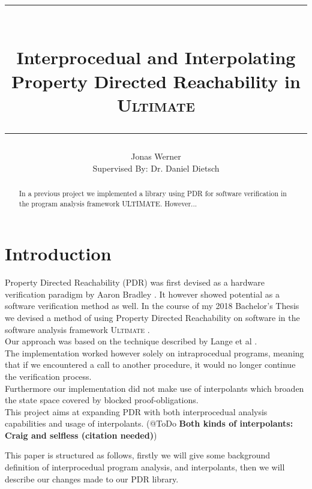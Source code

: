 \documentclass{article}
\begin{document}
	\newcommand{\HorizontalLine}{\rule{\linewidth}{0.3mm}}
	
	\title{ \HorizontalLine \\ \textbf{Interprocedual and Interpolating \\ Property Directed Reachability in \textsc{Ultimate}} \HorizontalLine}
	

	
	\author{Jonas Werner \\ Supervised By: Dr. Daniel Dietsch}


	
	\date{} 
	
	\maketitle
	
	\begin{abstract}
	In a previous project we implemented a library using PDR for software verification in the program analysis framework ULTIMATE. However...
	\end{abstract}
	
	
	\section{Introduction}
	
	Property Directed Reachability (PDR) was first devised as a hardware verification paradigm by Aaron Bradley \cite{DBLP:conf/vmcai/Bradley11}. It however showed potential as a software verification method as well.
	In the course of my 2018 Bachelor's Thesis we devised a method of using Property Directed Reachability on software in the software analysis framework \textsc{Ultimate} \cite{Zitat02}. \\
	Our approach was based on the technique described by Lange et al \cite{DBLP:conf/date/WelpK13}. \\ The implementation worked however solely on intraprocedual programs, meaning that if we encountered a call to another procedure, it would no longer continue the verification process. \\
	Furthermore our implementation did not make use of interpolants which broaden the state space covered by blocked proof-obligations. \\
	This project aims at expanding PDR with both interprocedual analysis capabilities and usage of interpolants. (@ToDo \textbf{Both kinds of interpolants: Craig and selfless (citation needed)}) \par
    This paper is structured as follows, firstly we will give some background definition of interprocedual program analysis, and interpolants, then we will describe our changes made to our PDR library.
	
\end{document}
